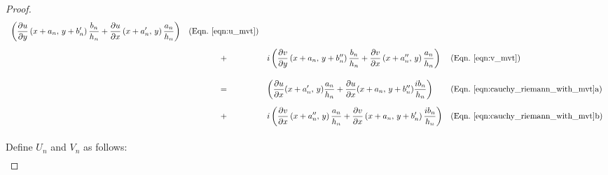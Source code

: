 \documentclass{article}
\theoremstyle{definition}
\begin{document}
\begin{proof}
\begin{equation}
\begin{array}{rcll}
                    \displaystyle
                    \left(
                        \frac{\partial{u}}{\partial{y}}
                        \left(x+a_{n},\,y+b_{n}^{\prime}\right)
                        \frac{b_{n}}{h_{n}}
                        +\frac{\partial{u}}{\partial{x}}
                        \left(x+a_{n}^{\prime},\,y\right)
                        \frac{a_{n}}{h_{n}}
                    \right)
                    &\textrm{(Eqn.~\ref{eqn:u_mvt})}
                    \\[1.5em]
                    &+&
                    \displaystyle
                    i\left(
                        \frac{\partial{v}}{\partial{y}}
                        \left(x+a_{n},\,y+b_{n}^{\prime\prime}\right)
                        \frac{b_{n}}{h_{n}}
                        +\frac{\partial{v}}{\partial{x}}
                        \left(x+a_{n}^{\prime\prime},\,y\right)
                        \frac{a_{n}}{h_{n}}
                    \right)
                    &
                    \textrm{(Eqn.~\ref{eqn:v_mvt})}
                    \\[2em]
                    &=&
                    \displaystyle
                    \left(
                        \frac{\partial{u}}{\partial{x}}
                        (x+a_{n}^{\prime},\,y)
                        \frac{a_{n}}{h_{n}}
                        +\frac{\partial{u}}{\partial{x}}
                        (x+a_{n},\,y+b_{n}^{\prime\prime})
                        \frac{ib_{n}}{h_{n}}
                    \right)
                    &
                    \textrm{(Eqn.~\ref{eqn:cauchy_riemann_with_mvt}a)}\\[1.5em]
                    &+&
                    \displaystyle
                    i\left(
                        \frac{\partial{v}}{\partial{x}}
                        \left(x+a_{n}^{\prime\prime},\,y\right)
                        \frac{a_{n}}{h_{n}}
                        +\frac{\partial{v}}{\partial{x}}
                        \left(x+a_{n},\,y+b_{n}^{\prime}\right)
                        \frac{ib_{n}}{h_{n}}
                    \right)
                    &
                    \textrm{(Eqn.~\ref{eqn:cauchy_riemann_with_mvt}b)}\\[1.5em]
                \end{array}
            \end{equation}
            Define $U_{n}$ and $V_{n}$ as follows:
            \begin{equation}
                \begin{array}{rcl}

\end{array}
\end{equation}
\end{proof}
\end{document}
